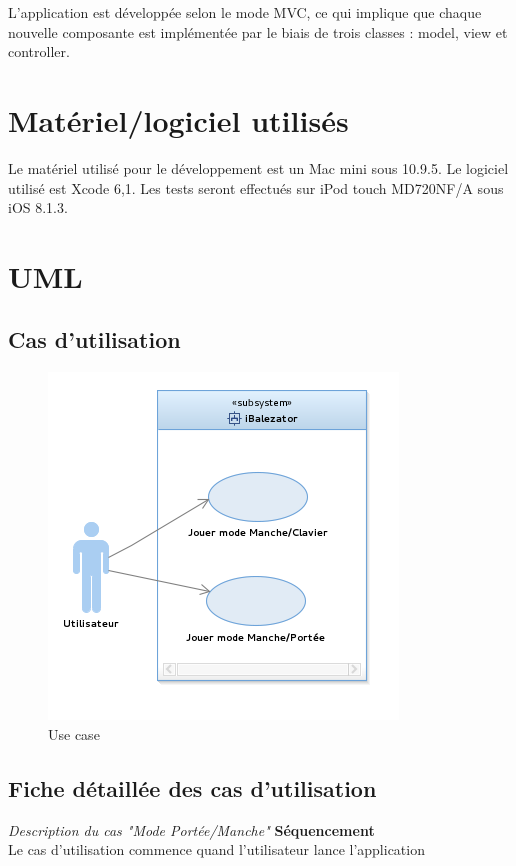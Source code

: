 \documentclass{scrreprt}
\begin{document}
L’application est développée selon le mode MVC, ce qui implique que chaque nouvelle composante est implémentée par le biais de trois classes : model, view et controller.

\section{Matériel/logiciel utilisés}
Le matériel utilisé pour le développement est un Mac mini sous 10.9.5. Le logiciel utilisé est Xcode 6,1. Les tests seront effectués sur iPod touch MD720NF/A sous iOS 8.1.3.

\section{UML}



\subsection{Cas d’utilisation}

\begin{figure}[!h]
        \centering
        \includegraphics{images/uml_use_case.png}
        \caption{Use case}
        \label{fig:use_case}
\end{figure}


\subsection{Fiche détaillée des cas d’utilisation}

\noindent \emph{Description du cas "Mode Portée/Manche" }
\medbreak
\textbf{Séquencement}\\
Le cas d'utilisation commence quand l'utilisateur lance l'application
\bigbreak
\end{document}
